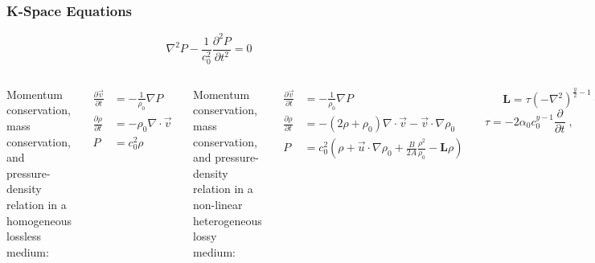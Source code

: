 \documentclass{beamer}
\begin{document}
		\begin{frame}[label=kSpaceEquations]
			\frametitle{K-Space Equations}
			\scriptsize
			\begin{equation*}
				\nabla^2 P - \frac{1}{c_0^2}\frac{\partial^2 P}{\partial t^2} = 0
			\end{equation*}
			\begin{columns}[t]
					Momentum conservation, mass conservation, and pressure-density relation in a homogeneous lossless medium:

					\begin{align*}
						\frac{\partial \vec{v}}{\partial t} &= -\frac{1}{\rho_0}\nabla P \\
						\frac{\partial \rho}{\partial t} &= -\rho_0 \nabla \cdot \vec{v} \\
						P &= c_0^2 \rho
					\end{align*}

					Momentum conservation, mass conservation, and pressure-density relation in a non-linear heterogeneous lossy medium:

					\begin{align*}
						\frac{\partial \vec{v}}{\partial t} &= -\frac{1}{\rho_0}\nabla P \\
						\frac{\partial \rho}{\partial t} &= -\left(2\rho + \rho_0\right)\nabla \cdot \vec{v} - \vec{v}\cdot\nabla\rho_0 \\
						P &= c_0^2 \left(\rho + \vec{u}\cdot\nabla\rho_0 + \frac{B}{2A}\frac{\rho^2}{\rho_0} - \mathbf{L}\rho\right)
					\end{align*}

					\begin{equation*}
						\mathbf{L} = \tau\left(-\nabla^2\right)^{\frac{y}{2}-1} + \eta\left(-\nabla^2\right)^{\frac{y+1}{2}-1}
					\end{equation*}
					\begin{equation*}
						\tau = -2\alpha_0 c_0^{y - 1}\frac{\partial}{\partial t} \;,\qquad \eta = 2\alpha_0 c_0^y \tan\left(\frac{\pi y}{2}\right)
					\end{equation*}
			\end{columns}
		\end{frame}
\end{document}

